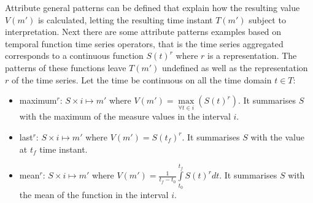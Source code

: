 



Attribute general patterns can be defined that explain how the
resulting value $V(m')$ is calculated, letting the resulting time
instant $T(m')$ subject to interpretation.  Next there are some
attribute patterns examples based on temporal function time series
operators, that is the time series aggregated corresponds to a
continuous function $S(t)^r$ where $r$ is a representation. The
patterns of these functions leave $T(m')$ undefined as well as the
representation $r$ of the time series. Let the time be continuous on
all the time domain $t\in T$:
\begin{itemize}
\item maximum$^r$: $S \times i \mapsto m'$ where $V(m') =
  \max\limits_{\forall t \in i}(S(t)^r)$. It summarises $S$ with the maximum
  of the measure values in the interval $i$.
\item last$^r$: $S \times i \mapsto m'$ where $V(m') = S(t_f)^r$. It
  summarises $S$ with the value at $t_f$ time instant.
\item mean$^r$: $S \times i \mapsto m'$ where $V(m') =
  \frac{1}{t_f-t_0} \int\limits_{t_0}^{t_f} S(t)^r dt$. It summarises $S$
  with the mean of the function in the interval $i$.
\end{itemize}


